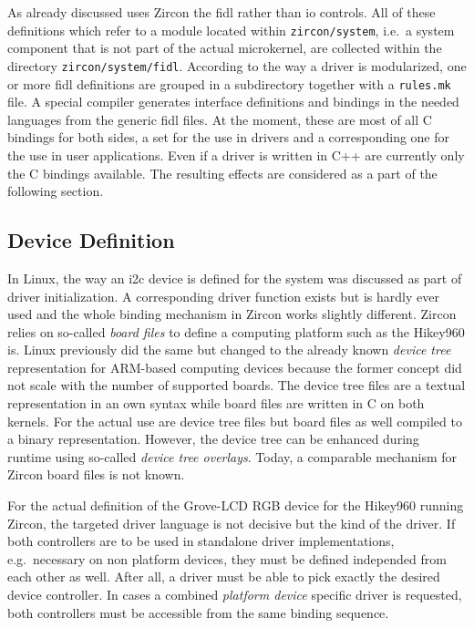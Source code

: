 As already discussed uses Zircon the \acf{fidl} rather than \ac{io} controls.
All of these definitions which refer to a module located within \texttt{zircon/system}, i.e.\ a system component that is not part of the actual microkernel, are collected within the directory \texttt{zircon/system/fidl}.
According to the way a driver is modularized, one or more \ac{fidl} definitions are grouped in a subdirectory together with a \texttt{rules.mk} file.
A special compiler generates interface definitions and bindings in the needed languages from the generic \ac{fidl} files.
At the moment, these are most of all C bindings for both sides, a set for the use in drivers and a corresponding one for the use in user applications.
Even if a driver is written in C++ are currently only the C bindings available.
The resulting effects are considered as a part of the following section.

\subsection{Device Definition}
In Linux, the way an \ac{i2c} device is defined for the system was discussed as part of driver initialization.
A corresponding driver function exists but is hardly ever used and the whole binding mechanism in Zircon works slightly different.
Zircon relies on so-called \textit{board files} to define a computing platform such as the Hikey960 is.
Linux previously did the same but changed to the already known \textit{device tree} representation for ARM-based computing devices because the former concept did not scale with the number of supported boards.
The device tree files are a textual representation in an own syntax while board files are written in C on both kernels.
For the actual use are device tree files but board files as well compiled to a binary representation.
However, the device tree can be enhanced during runtime using so-called \textit{device tree overlays}.
Today, a comparable mechanism for Zircon board files is not known.

For the actual definition of the Grove-LCD RGB device for the Hikey960 running Zircon, the targeted driver language is not decisive but the kind of the driver.
If both controllers are to be used in standalone driver implementations, e.g.\ necessary on non platform devices, they must be defined independed from each other as well.
After all, a driver must be able to pick exactly the desired device controller.
In cases a combined \textit{platform device} specific driver is requested, both controllers must be accessible from the same binding sequence.

